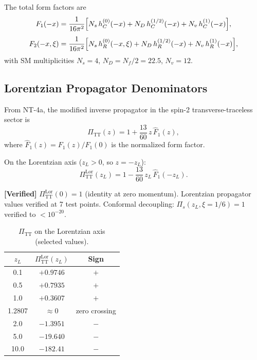 \documentclass[11pt,a4paper]{article}
\theoremstyle{definition}
\theoremstyle{remark}
\newcommand{\verified}[1]{%
  \par\smallskip\noindent
  \colorbox{green!10}{\parbox{\dimexpr\linewidth-2\fboxsep}{%
    \textcolor{green!50!black}{\textbf{[Verified]}} #1}}%
  \par\smallskip}
\begin{document}
The total form factors are
\begin{align}
  F_1(-x) &= \frac{1}{16\pi^2}\Bigl[
    N_s\, h_C^{(0)}(-x) + N_D\, h_C^{(1/2)}(-x) + N_v\, h_C^{(1)}(-x)
  \Bigr],
  \label{eq:F1-lor}\\[4pt]
  F_2(-x,\xi) &= \frac{1}{16\pi^2}\Bigl[
    N_s\, h_R^{(0)}(-x,\xi) + N_D\, h_R^{(1/2)}(-x) + N_v\, h_R^{(1)}(-x)
  \Bigr],
  \label{eq:F2-lor}
\end{align}
with SM multiplicities $N_s = 4$, $N_D = N_f/2 = 22.5$, $N_v = 12$.


\subsection{Lorentzian Propagator Denominators}
\label{sec:Pi-lorentzian}

From NT-4a, the modified inverse propagator in the spin-2
transverse-traceless sector is
\begin{equation}
  \label{eq:Pi-TT}
  \Pi_{\mathrm{TT}}(z) = 1 + \frac{13}{60}\,z\,\hat{F}_1(z),
\end{equation}
where $\hat{F}_1(z) = F_1(z)/F_1(0)$ is the normalized form factor.

On the Lorentzian axis ($z_L > 0$, so $z = -z_L$):
\begin{equation}
  \label{eq:Pi-TT-lor}
  \Pi_{\mathrm{TT}}^{\mathrm{Lor}}(z_L) = 1 - \frac{13}{60}\,z_L\,\hat{F}_1(-z_L).
\end{equation}

\verified{$\Pi_{\mathrm{TT}}^{\mathrm{Lor}}(0) = 1$ (identity at
zero momentum).  Lorentzian propagator values verified at 7 test points.
Conformal decoupling: $\Pi_s(z_L, \xi = 1/6) = 1$ verified to
$<10^{-20}$.}

\begin{table}[H]
\centering
\caption{$\Pi_{\mathrm{TT}}$ on the Lorentzian axis (selected values).}
\label{tab:Pi-TT-lorentzian}
\begin{tabular}{ccc}
\toprule
$z_L$ & $\Pi_{\mathrm{TT}}^{\mathrm{Lor}}(z_L)$ & Sign \\
\midrule
0.1 & $+0.9746$ & $+$ \\
0.5 & $+0.7935$ & $+$ \\
1.0 & $+0.3607$ & $+$ \\
1.2807 & $\approx 0$ & zero crossing \\
2.0 & $-1.3951$ & $-$ \\
5.0 & $-19.640$ & $-$ \\
10.0 & $-182.41$ & $-$ \\
\bottomrule
\end{tabular}
\end{table}
\end{document}
